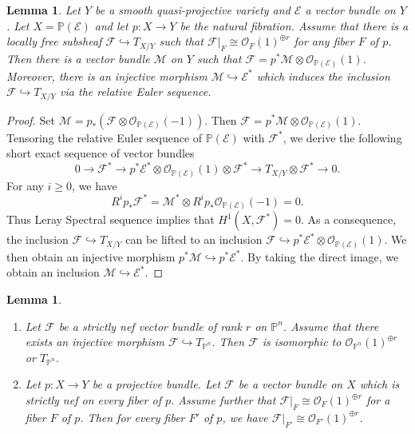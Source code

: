 \documentclass[english,reqno]{amsart}
\newcommand\bbP{{\mathbb P}}
\newcommand\sE{{\mathscr E}}
\newcommand\sF{{\mathscr F}}
\newcommand\sM{{\mathscr M}}
\newcommand\sO{{\mathscr O}}
\theoremstyle{plain}
\newtheorem{lemma}[thm]{Lemma}
\theoremstyle{definition}
\numberwithin{equation}{section} %
\begin{document}
\begin{lemma}\label{lemma:factorization}
Let $Y$ be a smooth quasi-projective variety and $\sE$ a vector bundle on $Y$. Let  $X=\mathbb{P}(\sE)$ and  let $p\colon X\to Y$ be the natural fibration. Assume that there is a locally free subsheaf $\sF \hookrightarrow T_{X/Y}$ such that $\sF|_F\cong \sO_{F}(1)^{\oplus r}$ for any fiber $F$ of $p$. Then there is a  vector bundle $\sM$ on $Y$ such that $\sF = p^*\sM\otimes \sO_{\mathbb{P}(\sE)}(1)$. Moreover, there is an injective morphism $\sM \hookrightarrow \sE^*$ which induces the inclusion $\sF \hookrightarrow T_{X/Y}$ via the relative Euler sequence.
\end{lemma}


\begin{proof}
Set $\sM=p_*(\sF \otimes \sO_{\mathbb{P}(\sE)}(-1))$. Then $\sF = p^*\sM\otimes \sO_{\bbP(\sE)}(1).$
Tensoring the relative Euler sequence of $\bbP(\sE)$ with $\sF^*$, we  derive the following short exact sequence of vector bundles
    \[0\rightarrow \sF^*\rightarrow p^*\sE^*\otimes\sO_{\bbP(\sE)}(1)\otimes\sF^*\rightarrow T_{X/Y}\otimes\sF^*\rightarrow 0.\]
    For any $i\geqslant 0$, we have
    \[R^i p_*\sF^*=\sM^*\otimes R^i p_*\sO_{\bbP(\sE)}(-1)=0.\]
    Thus Leray Spectral sequence   implies that  $H^1(X,\sF^*)=0.$
    As a consequence,  the inclusion $\sF\hookrightarrow T_{X/Y}$ can be lifted to an inclusion $\sF\hookrightarrow p^*\sE^*\otimes\sO_{\bbP(\sE)}(1)$.
    We then obtain an  injective morphism $p^*\sM \hookrightarrow p^*\sE^*$. By taking the direct image, we obtain an inclusion  $\sM\hookrightarrow \sE^*$.
\end{proof}



\begin{lemma}\label{Pn} 	
    \begin{enumerate}
    	\item Let $\sF$ be a strictly nef vector bundle of rank $r$ on $\bbP^n$. Assume that there exists an injective morphism $\sF\hookrightarrow T_{\bbP^n}$. Then $\sF$ is isomorphic to $\sO_{\bbP^n}(1)^{\oplus r}$ or $T_{\bbP^n}$.
    	
    	\item Let $p\colon X \rightarrow Y$  be a projective bundle. Let $\sF$ be a vector bundle on $X$  which is strictly nef on every fiber of $p$. Assume further that $\sF|_F \cong \sO_{F}(1)^{\oplus r}$ for a fiber $F$ of $p$. Then for every fiber $F'$ of $p$, we have $\sF|_{F'} \cong \sO_{F'}(1)^{\oplus r}$.
    \end{enumerate}
  
\end{lemma}
\end{document}
